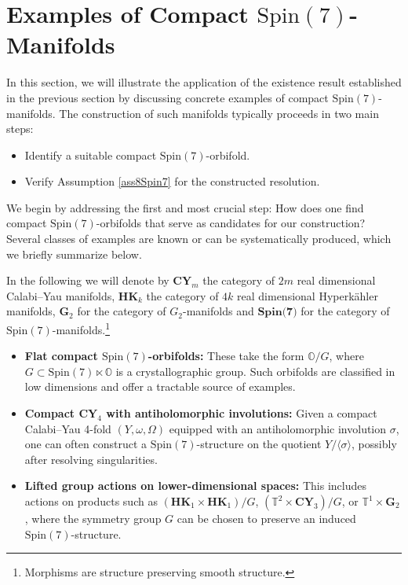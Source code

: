 \documentclass[psamsfonts]{amsart}
\theoremstyle{plain}
\theoremstyle{definition}{
\newtheorem{defi}{Definition}[section]
\newtheorem{ass}{Assumption}
\newtheorem*{nota}{Notation}}
\theoremstyle{remark}{
\newtheorem{rem}{Remark}
\newtheorem{ex}{Example}}
\theoremstyle{plain}{
\newtheorem{thm}{Theorem}[section]
\newtheorem{lem}{Lemma}[section]
\newtheorem{cor}{Corollary}[section]
\newtheorem{prop}{Proposition}[section]
\newtheorem{con}{Conjecture}[section]}
\newcommand{\m}[1]{{\mathrm{#1}}}
\newcommand{\cat}[1]{\textbf{#1}}
\begin{document}
\section{Examples of Compact $\m{Spin}(7)$-Manifolds}
\label{Examples of Compact Spin(7)-Manifolds}

In this section, we will illustrate the application of the existence result established in the previous section by discussing concrete examples of compact $\m{Spin}(7)$-manifolds. The construction of such manifolds typically proceeds in two main steps:\\

\begin{itemize}
    \item[1.] Identify a suitable compact $\m{Spin}(7)$-orbifold.
    \item[2.] Verify Assumption \ref{ass8Spin7} for the constructed resolution.\\
\end{itemize}

We begin by addressing the first and most crucial step: How does one find compact $\m{Spin}(7)$-orbifolds that serve as candidates for our construction? Several classes of examples are known or can be systematically produced, which we briefly summarize below.

\begin{nota}
In the following we will denote by $\cat{CY}_m$ the category of $2m$ real dimensional Calabi--Yau manifolds, $\cat{HK}_k$ the category of $4k$ real dimensional Hyperkähler manifolds, $\cat{G}_2$ for the category of $G_2$-manifolds and $\cat{Spin(7)}$ for the category of $\m{Spin}(7)$-manifolds.\footnote{Morphisms are structure preserving smooth structure.}
\end{nota}



\begin{itemize}
    \item \textbf{Flat compact $\m{Spin}(7)$-orbifolds:} These take the form $\mathbb{O}/G$, where $G \subset \m{Spin}(7) \ltimes \mathbb{O}$ is a crystallographic group. Such orbifolds are classified in low dimensions and offer a tractable source of examples.
    \item \textbf{Compact $\cat{CY}_4$ with antiholomorphic involutions:} Given a compact Calabi--Yau 4-fold $(Y, \omega, \Omega)$ equipped with an antiholomorphic involution $\sigma$, one can often construct a $\m{Spin}(7)$-structure on the quotient $Y/\langle \sigma \rangle$, possibly after resolving singularities.
    \item \textbf{Lifted group actions on lower-dimensional spaces:} This includes actions on products such as $(\cat{HK}_1 \times \cat{HK}_1)/G$, $(\mathbb{T}^2\times\cat{CY}_3)/G$, or $\mathbb{T}^1\times\cat{G}_2$, where the symmetry group $G$ can be chosen to preserve an induced $\m{Spin}(7)$-structure.
\end{itemize}
\end{document}
